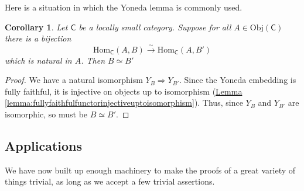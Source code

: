 \documentclass[a4paper]{report}
\newcommand{\Obj}{\mathrm{Obj}}
\newcommand{\Hom}{\mathrm{Hom}}
\theoremstyle{definition}
\theoremstyle{plain}
\newtheorem{corollary}{Corollary}[section]
\theoremstyle{remark}
\begin{document}
Here is a situation in which the Yoneda lemma is commonly used.
\begin{corollary}
  \label{cor:yonedaembeddingrespectsisomorphisms}
  Let $\mathsf{C}$ be a locally small category. Suppose for all $A \in \Obj(\mathsf{C})$ there is a bijection
  \begin{equation*}
    \Hom_{\mathsf{C}}(A, B) \stackrel{\sim}{\to} \Hom_{\mathsf{C}}(A, B')
  \end{equation*}
  which is natural in $A$. Then $B \simeq B'$
\end{corollary}
\begin{proof}
  We have a natural isomorphism $Y_{B} \Rightarrow Y_{B'}$. Since the Yoneda embedding is fully faithful, it is injective on objects up to isomorphism (\hyperref[lemma:fullyfaithfulfunctorinjectiveuptoisomorphism]{Lemma \ref*{lemma:fullyfaithfulfunctorinjectiveuptoisomorphism}}). Thus, since $Y_{B}$ and $Y_{B'}$ are isomorphic, so must be $B \simeq B'$.
\end{proof}

\subsection{Applications}
We have now built up enough machinery to make the proofs of a great variety of things trivial, as long as we accept a few trivial assertions. 
\end{document}
